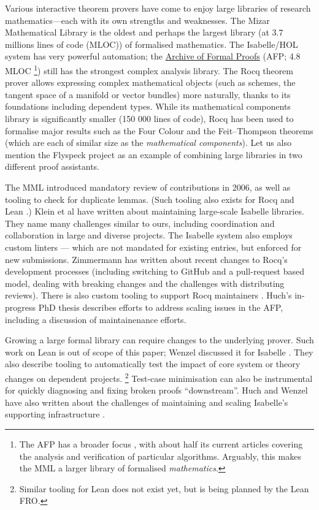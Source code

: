 \documentclass[runningheads]{llncs}
\begin{document}
Various interactive theorem provers have come to enjoy large libraries of research mathematics---each with its own strengths and weaknesses.
The Mizar Mathematical Library \cite{RoleOfMML} is the oldest and perhaps the largest library (at 3.7 millions lines of code (MLOC)) of formalised mathematics.
The Isabelle/HOL system has very powerful automation; the \href{https://www.isa-afp.org/}{Archive of Formal Proofs} (AFP; 4.8 MLOC%
\footnote{The AFP has a broader focus \cite{MiningAFP}, with about half its current articles covering the analysis and verification of particular algorithms. Arguably, this makes the MML a larger library of formalised \emph{mathematics}.}) still has the strongest complex analysis library.
The Rocq theorem prover allows expressing complex mathematical objects (such as schemes, the tangent space of a manifold or vector bundles) more naturally, thanks to its foundations including dependent types.
While its mathematical components library \cite{mathcomp} is significantly smaller (150 000 lines of code), Rocq has been used to formalise major results such as the Four Colour and the Feit--Thompson theorems (which are each of similar size as the \emph{mathematical components}).
Let us also mention the Flyspeck project \cite{FlyspeckComplete} as an example of combining large libraries in two different proof assistants.

The MML introduced mandatory review of contributions in 2006, as well as tooling to check for duplicate lemmas. (Such tooling also exists for Rocq \cite{RocqGoalClone} and Lean \cite{tryAtEachStep}.)
Klein et al have written \cite{KleinLargeScale} about maintaining large-scale Isabelle libraries. They name many challenges similar to ours, including coordination and collaboration in large and diverse projects.
The Isabelle system also employs custom linters \cite{IsabelleLinters} --- which are not mandated for existing entries, but enforced for new submissions.
Zimmermann \cite{ZimmermannThesis} has written about recent changes to Rocq's development processes (including switching to GitHub and a pull-request based model, dealing with breaking changes and the challenges with distributing reviews). There is also custom tooling to support Rocq maintainers \cite{RocqBot}.
Huch's in-progress PhD thesis \cite{HuchThesisDraft} describes efforts to address scaling issues in the AFP, including a discussion of maintainenance efforts.

Growing a large formal library can require changes to the underlying prover.
Such work on Lean is out of scope of this paper; Wenzel discussed it for Isabelle \cite{Wenzel19}.
They also describe tooling to automatically test the impact of core system or theory changes on dependent projects.%
\footnote{Similar tooling for Lean does not exist yet, but is being planned by the Lean FRO.}
Test-case minimisation \cite{RocqMinimiser} can also be instrumental for quickly diagnosing and fixing broken proofs ``downstream''.
Huch and Wenzel have also written about the challenges of maintaining and scaling Isabelle's supporting infrastructure \cite{HuchIsabelleBuilds,HuchWenzelParallelAFP}.
\end{document}
